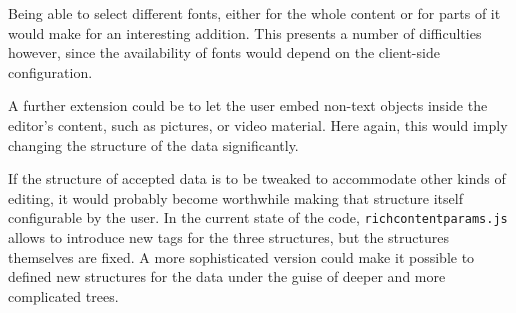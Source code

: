 \documentclass[11pt,a4paper]{article}
\begin{document}
Being able to select different fonts, either for the whole content or for parts of it would make for an interesting addition. This presents a number of difficulties however, since the availability of fonts would depend on the client-side configuration.

A further extension could be to let the user embed non-text objects inside the editor's content, such as pictures, or video material. Here again, this would imply changing the structure of the data significantly.  

If the structure of accepted data is to be tweaked to accommodate other kinds of editing, it would probably become worthwhile making that structure itself configurable by the user. In the current state of the code, \texttt{richcontentparams.js} allows to introduce new tags for the three structures, but the structures themselves are fixed. A more sophisticated version could make it possible to defined new structures for the data under the guise of deeper and more complicated trees.
\end{document}
